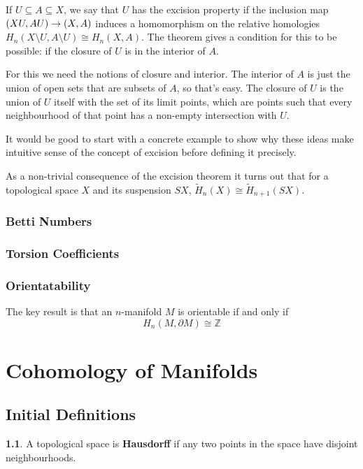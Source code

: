 \documentclass[oneside,english]{amsbook}
\numberwithin{section}{chapter}
\theoremstyle{plain}
\theoremstyle{definition}
\newtheorem{defn}[thm]{\protect\definitionname}
\providecommand{\definitionname}{Definition}
\begin{document}
	If $U\subseteq A\subseteq X$, we say that $U$ has the excision property if the inclusion map $(X\\ U, A\\ U)\to (X, A)$ induces a homomorphism on the relative homologies $H_{n}(X\setminus U,A\setminus U)\cong H_{n}(X,A)$. The theorem gives a condition for this to be possible: if the closure of $U$ is in the interior of $A$.
	
	For this we need the notions of closure and interior. The interior of $A$ is just the union of open sets that are subsets of $A$, so that's easy. The closure of $U$ is the union of $U$ itself with the set of its limit points, which are points such that every neighbourhood of that point has a non-empty intersection with $U$.
	
	It would be good to start with a concrete example to show why these ideas make intuitive sense of the concept of excision before defining it precisely.
	
	As a non-trivial consequence of the excision theorem it turns out that for a topological space $X$ and its suspension $SX$, $\widetilde{H}_n(X)\cong \widetilde{H}_{n+1}(SX)$.

	\section{Betti Numbers}
	
	\section{Torsion Coefficients}

	\section{Orientatability}
	
	The key result is that an $n$-manifold $M$ is orientable if and only if
	\[
		H_n(M, \partial M) \cong \mathbb{Z}  
	\]
	
	\part{Cohomology of Manifolds}
	
	\chapter{Initial Definitions}
	
		\begin{defn} 
			A topological space is \textbf{Hausdorff} if any two points in the space have disjoint neighbourhoods.
		\end{defn}
		
\end{document}
